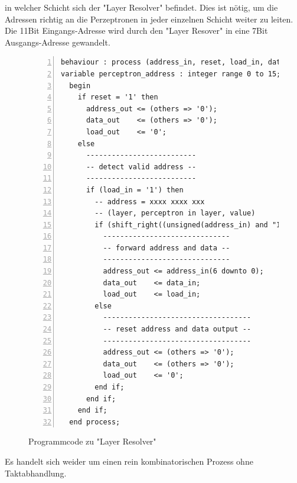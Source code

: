 \documentclass{article}
\numberwithin{equation}{section}
\begin{document}
in welcher Schicht sich der "Layer Resolver" befindet. Dies ist nötig, um die Adressen richtig 
an die Perzeptronen in jeder einzelnen Schicht weiter zu leiten. Die 11Bit Eingangs-Adresse 
wird durch den "Layer Resover" in eine 7Bit Ausgangs-Adresse gewandelt.
\begin{figure}[htbp]
\begin{lstlisting}[style=VHDL,numbers=left,stepnumber=1,basicstyle=\footnotesize]
behaviour : process (address_in, reset, load_in, data_in) is
variable perceptron_address : integer range 0 to 15;
  begin
    if reset = '1' then
      address_out <= (others => '0');
      data_out    <= (others => '0');
      load_out    <= '0';
    else
      --------------------------
      -- detect valid address --
      --------------------------
      if (load_in = '1') then
        -- address = xxxx xxxx xxx 
        -- (layer, perceptron in layer, value)
        if (shift_right((unsigned(address_in) and "11110000000"), 7) = layer_count) then
          ------------------------------
          -- forward address and data --
          ------------------------------
          address_out <= address_in(6 downto 0);
          data_out    <= data_in;
          load_out    <= load_in;
        else
          -----------------------------------
          -- reset address and data output --
          -----------------------------------
          address_out <= (others => '0');
          data_out    <= (others => '0');
          load_out    <= '0';
        end if;
      end if;
    end if;
  end process;
\end{lstlisting}
\caption{Programmcode zu "Layer Resolver"} \label{code:layer_resolver}
\end{figure}
\FloatBarrier
Es handelt sich weider um einen rein kombinatorischen Prozess ohne Taktabhandlung.
\end{document}
